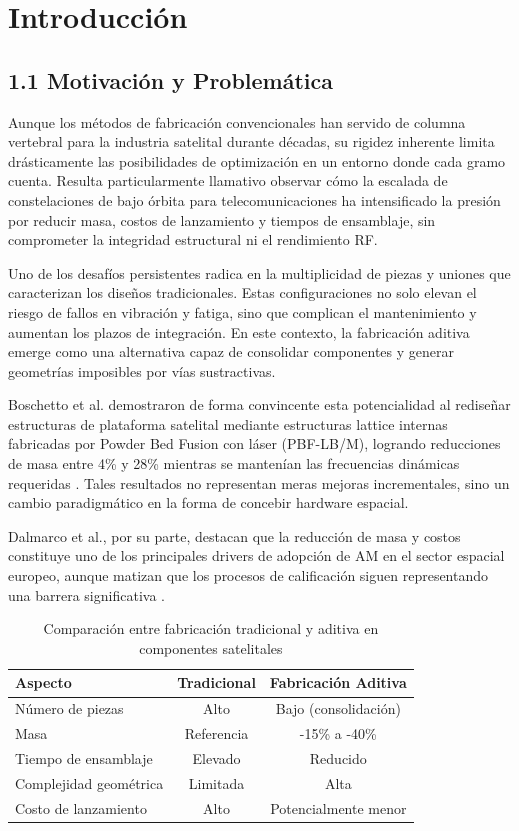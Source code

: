 \section{Introducción}

\subsection{1.1 Motivación y Problemática}

Aunque los métodos de fabricación convencionales han servido de columna vertebral para la industria satelital durante décadas, su rigidez inherente limita drásticamente las posibilidades de optimización en un entorno donde cada gramo cuenta. Resulta particularmente llamativo observar cómo la escalada de constelaciones de bajo órbita para telecomunicaciones ha intensificado la presión por reducir masa, costos de lanzamiento y tiempos de ensamblaje, sin comprometer la integridad estructural ni el rendimiento RF.

Uno de los desafíos persistentes radica en la multiplicidad de piezas y uniones que caracterizan los diseños tradicionales. Estas configuraciones no solo elevan el riesgo de fallos en vibración y fatiga, sino que complican el mantenimiento y aumentan los plazos de integración. En este contexto, la fabricación aditiva emerge como una alternativa capaz de consolidar componentes y generar geometrías imposibles por vías sustractivas. 

Boschetto et al. demostraron de forma convincente esta potencialidad al rediseñar estructuras de plataforma satelital mediante estructuras lattice internas fabricadas por Powder Bed Fusion con láser (PBF-LB/M), logrando reducciones de masa entre 4\% y 28\% mientras se mantenían las frecuencias dinámicas requeridas \cite{Boschetto2023}. Tales resultados no representan meras mejoras incrementales, sino un cambio paradigmático en la forma de concebir hardware espacial. 

Dalmarco et al., por su parte, destacan que la reducción de masa y costos constituye uno de los principales drivers de adopción de AM en el sector espacial europeo, aunque matizan que los procesos de calificación siguen representando una barrera significativa \cite{Dalmarco2026}.

\begin{table}[h]
\centering
\caption{Comparación entre fabricación tradicional y aditiva en componentes satelitales}
\label{tab:comparacion_trad_vs_am}
\begin{tabular}{lcc}
\hline
\textbf{Aspecto} & \textbf{Tradicional} & \textbf{Fabricación Aditiva} \\
\hline
Número de piezas & Alto & Bajo (consolidación) \\
Masa & Referencia & -15\% a -40\% \\
Tiempo de ensamblaje & Elevado & Reducido \\
Complejidad geométrica & Limitada & Alta \\
Costo de lanzamiento & Alto & Potencialmente menor \\
\hline
\end{tabular}
\end{table}

